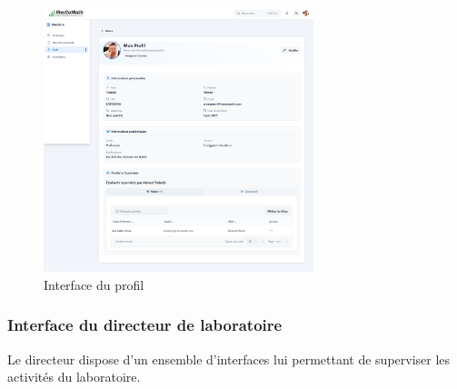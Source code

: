 \begin{figure}[H]
    \centering
    \includegraphics[width=0.7\textwidth]{images/interface/profil.png}
    \caption{Interface du profil}
    \label{fig:profil}
\end{figure}

\subsubsection{Interface du directeur de laboratoire}

Le directeur dispose d’un ensemble d’interfaces lui permettant de superviser les activités du laboratoire.

